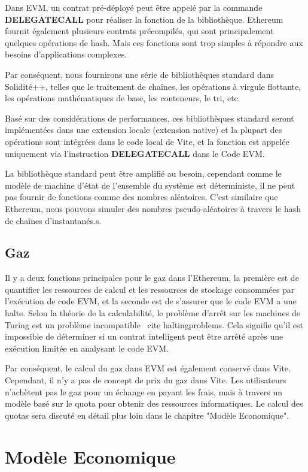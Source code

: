 \documentclass[UTF8,nofonts]{article}
\begin{document}
\begin{multicols}{2}
Dans EVM, un contrat pré-déployé peut être appelé par la commande \textbf{DELEGATECALL} pour réaliser la fonction de la bibliothèque. Ethereum fournit également plusieurs contrats précompilés, qui sont principalement quelques opérations de hash. Mais ces fonctions sont trop simples à répondre aux besoins d'applications complexes.

Par conséquent, nous fournirons une série de bibliothèques standard dans Solidité++, telles que le traitement de chaînes, les opérations à virgule flottante, les opérations mathématiques de base, les conteneurs, le tri, etc.

Basé sur des considérations de performances, ces bibliothèques standard seront implémentées dans une extension locale (extension native) et la plupart des opérations sont intégrées dans le code local de Vite, et la fonction est appelée uniquement via l'instruction \textbf{DELEGATECALL} dans le Code EVM.

La bibliothèque standard peut être amplifié au besoin, cependant comme le modèle de machine d'état de l'ensemble du système est déterministe, il ne peut pas fournir de fonctions comme des nombres aléatoires. C'est similaire que Ethereum, nous pouvons simuler des nombres pseudo-aléatoires à travers le hash de chaînes d'instantanés.s.

\subsection{Gaz}
Il y a deux fonctions principales pour le gaz dans l'Ethereum, la première est de quantifier les ressources de calcul et les ressources de stockage consommées par l'exécution de code EVM, et la seconde est de s'assurer que le code EVM a une halte. Selon la théorie de la calculabilité, le problème d'arrêt sur les machines de Turing est un problème incompatible \ cite {haltingproblems}. Cela signifie qu'il est impossible de déterminer si un contrat intelligent peut être arrêté après une exécution limitée en analysant le code EVM.

Par conséquent, le calcul du gaz dans EVM est également conservé dans Vite. Cependant, il n'y a pas de concept de prix du gaz dans Vite. Les utilisateurs n'achètent pas le gaz pour un échange en payant les frais, mais à travers un modèle basé sur le quota pour obtenir des ressources informatiques. Le calcul des quotas sera discuté en détail plus loin dans le chapitre "Modèle Economique".

\section{Modèle Economique}

\end{multicols}
\end{document}
